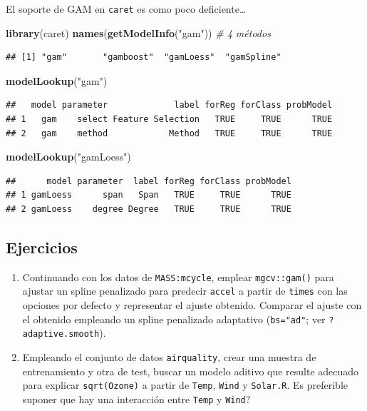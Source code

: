 \documentclass[
]{book}
\newenvironment{Shaded}{\begin{snugshade}}{\end{snugshade}}
\newcommand{\CommentTok}[1]{\textcolor[rgb]{0.56,0.35,0.01}{\textit{#1}}}
\newcommand{\KeywordTok}[1]{\textcolor[rgb]{0.13,0.29,0.53}{\textbf{#1}}}
\newcommand{\NormalTok}[1]{#1}
\newcommand{\StringTok}[1]{\textcolor[rgb]{0.31,0.60,0.02}{#1}}
\theoremstyle{break}
\theoremstyle{definition}
\theoremstyle{definition}
\theoremstyle{definition}
\theoremstyle{remark}
\begin{document}
El soporte de GAM en \texttt{caret} es como poco deficiente\ldots{}

\begin{Shaded}
\begin{Highlighting}[]
\KeywordTok{library}\NormalTok{(caret)}
\KeywordTok{names}\NormalTok{(}\KeywordTok{getModelInfo}\NormalTok{(}\StringTok{"gam"}\NormalTok{)) }\CommentTok{# 4 métodos}
\end{Highlighting}
\end{Shaded}

\begin{verbatim}
## [1] "gam"       "gamboost"  "gamLoess"  "gamSpline"
\end{verbatim}

\begin{Shaded}
\begin{Highlighting}[]
\KeywordTok{modelLookup}\NormalTok{(}\StringTok{"gam"}\NormalTok{)}
\end{Highlighting}
\end{Shaded}

\begin{verbatim}
##   model parameter             label forReg forClass probModel
## 1   gam    select Feature Selection   TRUE     TRUE      TRUE
## 2   gam    method            Method   TRUE     TRUE      TRUE
\end{verbatim}

\begin{Shaded}
\begin{Highlighting}[]
\KeywordTok{modelLookup}\NormalTok{(}\StringTok{"gamLoess"}\NormalTok{)}
\end{Highlighting}
\end{Shaded}

\begin{verbatim}
##      model parameter  label forReg forClass probModel
## 1 gamLoess      span   Span   TRUE     TRUE      TRUE
## 2 gamLoess    degree Degree   TRUE     TRUE      TRUE
\end{verbatim}

\hypertarget{ejercicios}{%
\subsection{Ejercicios}\label{ejercicios}}

\begin{enumerate}
\def\labelenumi{\arabic{enumi}.}
\item
  Continuando con los datos de \texttt{MASS:mcycle}, emplear \texttt{mgcv::gam()} para ajustar un spline penalizado para predecir \texttt{accel} a partir de \texttt{times} con las opciones por defecto y representar el ajuste obtenido. Comparar el ajuste con el obtenido empleando un spline penalizado adaptativo (\texttt{bs="ad"}; ver \texttt{?adaptive.smooth}).
\item
  Empleando el conjunto de datos \texttt{airquality}, crear una muestra de entrenamiento y otra de test, buscar un modelo aditivo que resulte adecuado para explicar \texttt{sqrt(Ozone)} a partir de \texttt{Temp}, \texttt{Wind} y \texttt{Solar.R}.
  Es preferible suponer que hay una interacción entre \texttt{Temp} y \texttt{Wind}?
\end{enumerate}
\end{document}
